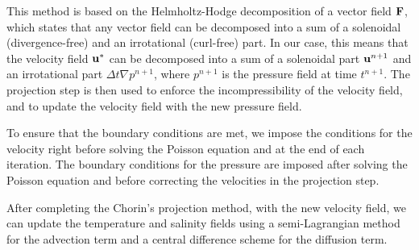 \documentclass{article}
\begin{document}
This method is based on the Helmholtz-Hodge decomposition of a vector field $\boldsymbol{\mathrm{F}}$, which states that any vector field can be decomposed into a sum of a solenoidal (divergence-free) and an irrotational (curl-free) part. In our case, this means that the velocity field $\boldsymbol{\mathrm{u}}^*$ can be decomposed into a sum of a solenoidal part $\boldsymbol{\mathrm{u}}^{n+1}$ and an irrotational part $\Delta t \nabla p^{n+1}$, where $p^{n+1}$ is the pressure field at time $t^{n+1}$. The projection step is then used to enforce the incompressibility of the velocity field, and to update the velocity field with the new pressure field.

To ensure that the boundary conditions are met, we impose the conditions for the velocity right before solving the Poisson equation and at the end of each iteration. The boundary conditions for the pressure are imposed after solving the Poisson equation and before correcting the velocities in the projection step.

After completing the Chorin's projection method, with the new velocity field, we can update the temperature and salinity fields using a semi-Lagrangian method for the advection term and a central difference scheme for the diffusion term.
\end{document}
